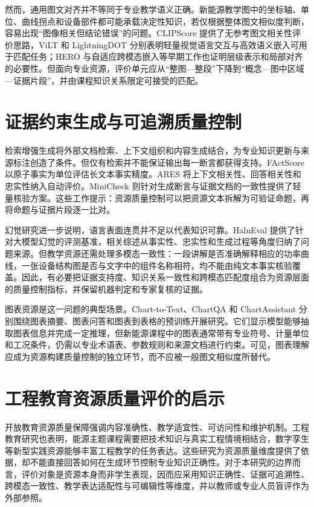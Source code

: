\documentclass[UTF8,11pt]{ctexart}
\begin{document}
然而，通用图文对齐并不等同于专业教学语义正确。新能源教学图中的坐标轴、单位、曲线拐点和设备部件都可能承载决定性知识，若仅根据整体图文相似度判断，容易出现``图像相关但结论错误''的问题。CLIPScore 提供了无参考图文相关性评价思路\cite{clipscoreareference2021}，ViLT 和 LightningDOT 分别表明轻量视觉语言交互与高效语义嵌入可用于匹配任务\cite{viltvisionand2021,lightningdotpretraining2021}；HERO 与自适应跨模态嵌入等早期工作也证明层级表示和局部对齐的必要性\cite{herohierarchicalencoder2020,adaptivecrossmodal2020}。但面向专业资源，评价单元应从``整图—整段''下降到``概念—图中区域—证据片段''，并由课程知识关系限定可接受的匹配。

\section{证据约束生成与可追溯质量控制}
检索增强生成将外部文档检索、上下文组织和内容生成结合，为专业知识更新与来源标注创造了条件\cite{retrievalaugmentedgeneration2023,asurveyon2024,retrievingmultimodalinformation2023}。但仅有检索并不能保证输出每一断言都获得支持。FActScore 以原子事实为单位评估长文本事实精度\cite{factscorefinegrained2023}。ARES 将上下文相关性、回答相关性和忠实性纳入自动评价\cite{aresanautomated2024}。MiniCheck 则针对生成断言与证据文档的一致性提供了轻量核验方案\cite{minicheckefficientfact2024}。这些工作提示：资源质量控制可以把资源文本拆解为可验证命题，再将命题与证据片段逐一比对。

幻觉研究进一步说明，语言表面连贯并不足以代表知识可靠。HaluEval 提供了针对大模型幻觉的评测基准，相关综述从事实性、忠实性和生成过程等角度归纳了问题来源\cite{haluevalalarge2023,asurveyon2023,surveyofhallucination2022}。但教学资源还需处理多模态一致性：一段讲解是否准确解释相应的功率曲线，一张设备结构图是否与文字中的组件名称相符，均不能由纯文本事实核验覆盖。因此，有必要把证据支持度、知识关系一致性和跨模态匹配度组合为资源层面的质量控制指标，并保留机器判定和专家复核的证据。

图表资源是这一问题的典型场景。Chart-to-Text、ChartQA 和 ChartAssistant 分别围绕图表摘要、图表问答和图表到表格的预训练开展研究\cite{charttotext2022,chartqaabenchmark2022,chartassistantauniversal2024,automaticchartunderstanding2023}。它们显示模型能够抽取图表信息并完成一定推理，但新能源课程中的图表通常带有专业符号、计量单位和工况条件，仍需以专业术语表、参数规则和来源文档进行约束。可见，图表理解应成为资源构建质量控制的独立环节，而不应被一般图文相似度所替代。

\section{工程教育资源质量评价的启示}
开放教育资源质量保障强调内容准确性、教学适宜性、可访问性和维护机制\cite{qualityassuranceof2022}。工程教育研究也表明，能源主题课程需要把技术知识与真实工程情境相结合\cite{anintegratedapproach2020}，数字孪生等新型实践资源能够丰富工程教学的任务表达\cite{developingaskilled2023}。这些研究为资源质量维度提供了依据，却不能直接回答如何在生成环节控制专业知识正确性。对于本研究的边界而言，评价对象是资源本身而非学生表现，因而应采用知识正确性、证据可追溯性、跨模态一致性、教学表达适配性与可编辑性等维度，并以教师或专业人员盲评作为外部参照。
\end{document}
